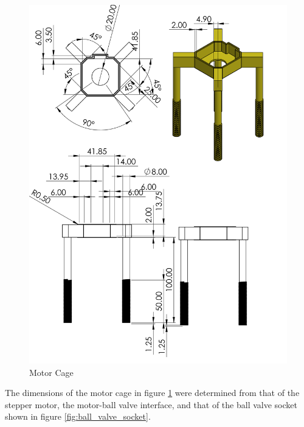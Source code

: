 \begin{enumerate}
\begin{enumerate}
    \begin{figure}[H]
        \centering
        \includegraphics[height=.75\textheight]{Figures/MotorCage.PNG}
        \caption{Motor Cage}
        \label{fig:motor_cage_stepper}
    \end{figure}
    
    The dimensions of the motor cage in figure \ref{fig:motor_cage_stepper} were determined from that of the stepper motor, the motor-ball valve interface, and that of the ball valve socket shown in figure \ref{fig:ball_valve_socket}.
    

\end{enumerate}
\end{enumerate}
